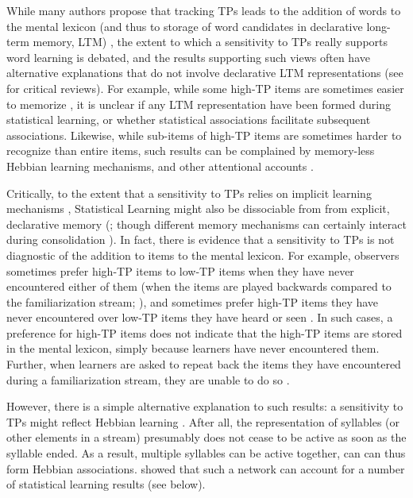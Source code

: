 \documentclass[
]{article}
\begin{document}
While many authors propose that tracking TPs leads to the addition of
words to the mental lexicon (and thus to storage of word candidates in
declarative long-term memory, LTM)
\citep{Erickson2014, Estes2007, Hay2011a, Isbilen2020, Karaman2018, Perruchet2019, Shoaib2018},
the extent to which a sensitivity to TPs really supports word learning
is debated, and the results supporting such views often have alternative
explanations that do not involve declarative LTM representations (see
\citep{Endress2020, Endress-stat-recall} for critical reviews). For
example, while some high-TP items are sometimes easier to memorize
\citep{Estes2007, Hay2011a, Isbilen2020, Karaman2018}, it is unclear if
any LTM representation have been formed during statistical learning, or
whether statistical associations facilitate subsequent associations.
Likewise, while sub-items of high-TP items are sometimes harder to
recognize than entire items, such results can be complained by
memory-less Hebbian learning mechanisms, and other attentional accounts
\citep{Endress-stat-recall}.

Critically, to the extent that a sensitivity to TPs relies on implicit
learning mechanisms \citep{Christiansen2018, Perruchet2006}, Statistical
Learning might also be dissociable from from explicit, declarative
memory
(\citep{Cohen1980, Finn2016, Graf1984, Knowlton1996a, Poldrack2001, Sherman2020, Squire1992};
though different memory mechanisms can certainly interact during
consolidation \citep{Robertson2022}). In fact, there is evidence that a
sensitivity to TPs is not diagnostic of the addition to items to the
mental lexicon. For example, observers sometimes prefer high-TP items to
low-TP items when they have never encountered either of them (when the
items are played backwards compared to the familiarization stream;
\citep{Endress-Action-Axc, Turk-Browne-reversal, Jones2007}), and
sometimes prefer high-TP items they have never encountered over low-TP
items they have heard or seen
\citep{Endress-Phantoms-Vision, Endress-Phantoms}. In such cases, a
preference for high-TP items does not indicate that the high-TP items
are stored in the mental lexicon, simply because learners have never
encountered them. Further, when learners are asked to repeat back the
items they have encountered during a familiarization stream, they are
unable to do so \citep{Endress-stat-recall}.

However, there is a simple alternative explanation to such results: a
sensitivity to TPs might reflect Hebbian learning
\citep{Endress-tone-tps, Endress-TP-Model}. After all, the
representation of syllables (or other elements in a stream) presumably
does not cease to be active as soon as the syllable ended. As a result,
multiple syllables can be active together, can can thus form Hebbian
associations. \citep{Endress-TP-Model} showed that such a network can
account for a number of statistical learning results (see below).
\end{document}
